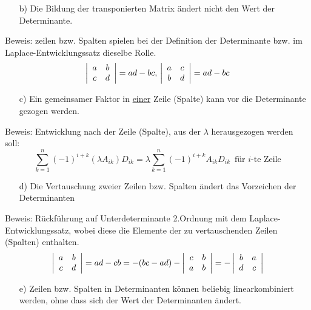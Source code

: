 \documentclass{article}
\begin{document}
\begin{itemize}
    \item[b)] Die  Bildung der transponierten Matrix ändert nicht den Wert der Determinante.
\end{itemize}
Beweis: zeilen bzw. Spalten spielen bei der Definition der Determinante bzw. im Laplace-Entwicklungssatz dieselbe Rolle.
\begin{equation*}
    \left\lvert \begin{array}{c c}a&b\\c&d\end{array}\right\rvert = ad-bc,\, \left\lvert \begin{array}{c c}a&c\\b&d\end{array}\right\rvert = ad - bc
\end{equation*}
\begin{itemize}
    \item[c)] Ein gemeinsamer Faktor in \underline{einer} Zeile (Spalte) kann vor die Determinante gezogen werden.
\end{itemize}
Beweis: Entwicklung nach der Zeile (Spalte), aus der $\lambda$ herausgezogen werden soll:
\begin{equation*}
    \sum_{k=1}^{n}(-1)^{i+k}(\lambda A_{ik})D_{ik} = \lambda \sum_{k=1}^{n}(-1)^{i+k}A_{ik}D_{ik}\, \text{ für } i \text{-te Zeile}
\end{equation*}
\begin{itemize}
    \item[d)] Die Vertauschung zweier Zeilen bzw. Spalten ändert das Vorzeichen der Determinanten
\end{itemize}
Beweis: Rückführung auf Unterdeterminante 2.Ordnung mit dem Laplace-Entwicklungssatz, wobei diese die Elemente der zu vertauschenden Zeilen (Spalten) enthalten.
\begin{equation*}
    \left\lvert \begin{array}{c c}a&b\\c&d\end{array}\right\rvert = ad-cb = -(bc-ad) - \left\lvert \begin{array}{c c}c&b\\a&b\end{array} \right\rvert=-\left\lvert \begin{array}{c c}b&a\\d&c\end{array}\right\rvert
\end{equation*}
\begin{itemize}
    \item[e)] Zeilen bzw. Spalten in Determinanten können beliebig linearkombiniert werden, ohne dass sich der Wert der Determinanten ändert.
\end{itemize}
\end{document}
